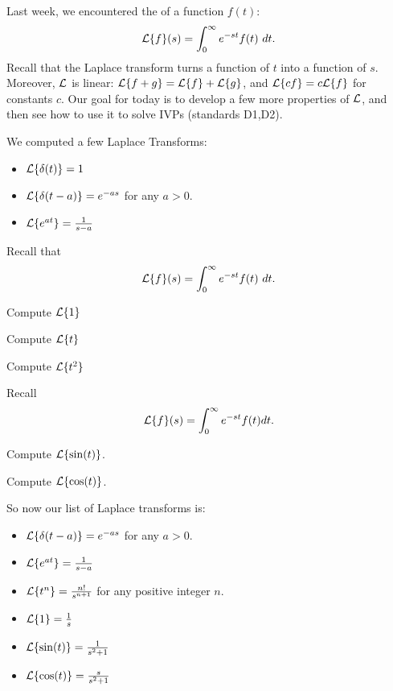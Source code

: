 \begin{applicationActivities}

\begin{observation}
Last week, we encountered the  of a function \(f(t)\):
\[\L\{f\}(s)=\int _0 ^\infty e^{-st}f(t)\ dt.\]
\vfill
Recall that the Laplace transform turns a function of \(t\) into a function of \(s\).
\vfill
Moreover, \(\mathcal{L}\) is linear: \(\mathcal{L}\{f+g\}=\mathcal{L}\{f\}+\mathcal{L}\{g\}\), and \(\mathcal{L}\{cf\}=c\mathcal{L}\{f\}\) for constants \(c\).
\vfill
Our goal for today is to develop a few more properties of \(\mathcal{L}\), and then see how to use it to solve IVPs (standards D1,D2).
\end{observation}

\begin{observation}
We computed a few Laplace Transforms:
\begin{itemize}
\item \(\mathcal{L}\{\delta(t)\} = 1\)
\item \(\mathcal{L}\{\delta(t-a)\} = e^{-as}\) for any \(a>0\).
\item \(\mathcal{L}\{e^{at}\} = \frac{1}{s-a}\) 
\end{itemize}
\end{observation}

\begin{activity}{10}
Recall that \[\L\{f\}(s)=\int _0 ^\infty e^{-st} f(t)\ dt.\]
\begin{subactivity}
Compute \(\mathcal{L}\{1\}\)
\end{subactivity}
\begin{subactivity}
Compute \(\mathcal{L}\{t\}\)
\end{subactivity}
\begin{subactivity}
Compute \(\mathcal{L}\{t^2\}\)
\end{subactivity}
\end{activity}


\begin{activity}{10}
Recall \[\mathcal{L}\{f\}(s)=\int _0 ^\infty e^{-st}f(t)dt.\]
\begin{subactivity}
Compute \(\mathcal{L}\{\sin(t)\}\).
\end{subactivity}
\begin{subactivity}
Compute \(\mathcal{L}\{\cos(t)\}\).
\end{subactivity}
\end{activity}

\begin{observation}
So now our list of Laplace transforms is:
\begin{itemize}
\item \(\mathcal{L}\{\delta(t-a)\} = e^{-as}\) for any \(a>0\).
\item \(\mathcal{L}\{e^{at}\} = \frac{1}{s-a}\) 
\item \(\mathcal{L}\{t^n\} = \frac{n!}{s^{n+1}}\) for any positive integer \(n\).
\item \(\mathcal{L}\{1\} = \frac{1}{s}\)
\item \(\mathcal{L}\{\sin(t)\} = \frac{1}{s^2+1}\)
\item \(\mathcal{L}\{\cos(t)\} = \frac{s}{s^2+1}\)
\end{itemize}
\end{observation}


\end{applicationActivities}
